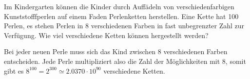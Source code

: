 Im Kindergarten können die Kinder durch Auffädeln von
verschiedenfarbigen Kunststofffperlen auf einem Faden
Perlenketten herstellen. Eine Kette hat 100 Perlen,
es stehen Perlen in 8 verschiedenen Farben in fast unbegrenzter
Zahl zur Verfügung.
Wie viel verschiedene Ketten können hergestellt werden?


\begin{loesung}
Bei jeder neuen Perle muss sich das Kind zwischen 8 verschiedenen
Farben entscheiden. Jede Perle multipliziert also die Zahl
der Möglichkeiten mit $8$, somit gibt es
$8^{100}=2^{300}\simeq2.0370\cdot10^{90}$
verschiedene Ketten.
\end{loesung}

